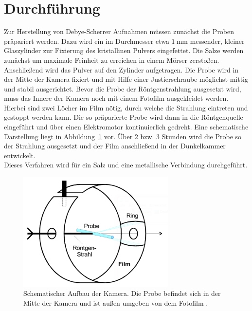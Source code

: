 \section{Durchführung}
\label{sec:durchführung}

Zur Herstellung von Debye-Scherrer Aufnahmen müssen zunächst die Proben präpariert werden. Dazu wird ein im Durchmesser
etwa $\SI{1}{\milli\meter}$ messender, kleiner Glaszylinder zur Fixierung des kristallinen Pulvers eingefettet.
Die Salze werden zunächst um maximale Feinheit zu erreichen in einem Mörser zerstoßen. Anschließend wird das Pulver
auf den Zylinder aufgetragen. Die Probe wird in der Mitte der Kamera fixiert und mit Hilfe einer Justierschraube möglichst
mittig und stabil ausgerichtet. Bevor die Probe der Röntgenstrahlung ausgesetzt wird, muss das Innere der Kamera
noch mit einem Fotofilm ausgekleidet werden. Hierbei sind zwei Löcher im Film nötig, durch welche die Strahlung
eintreten und gestoppt werden kann. Die so präparierte Probe wird dann in die Röntgenquelle eingeführt und über einen
Elektromotor kontinuierlich gedreht. Eine schematische Darstellung liegt in Abbildung~\ref{fig:aufbau} vor.
Über 2 bzw. 3 Stunden wird die Probe so der Strahlung ausgesetzt und der Film anschließend in der Dunkelkammer entwickelt. \\
Dieses Verfahren wird für ein Salz und eine metallische Verbindung durchgeführt.
%
\begin{figure}[htb]
  \centering
  \includegraphics[width=0.7\textwidth]{figures/plot_aufbau.pdf}
  \caption{Schematischer Aufbau der Kamera. Die Probe befindet sich in der Mitte der Kamera und ist außen umgeben von dem Fotofilm \cite{V41}.}
  \label{fig:aufbau}
\end{figure}
